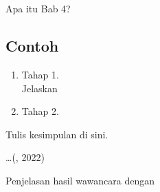 \chapter{\babEmpat}
Apa itu Bab 4?


\section{Contoh}
\begin{enumerate}
	\item Tahap 1. \\ %
	Jelaskan %

	\item Tahap 2.
\end{enumerate}

Tulis kesimpulan di sini.

\begin{kutipan}
 \lipsum[22]
 \ldots (\narsumSatu, 2022)
\end{kutipan}

Penjelasan hasil wawancara dengan \narsumSatu~ \lipsum[23]
